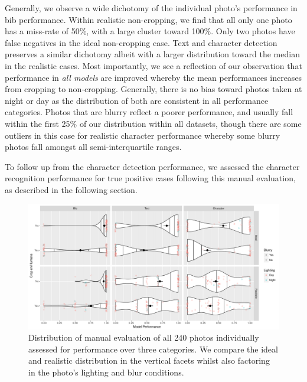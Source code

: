 Generally, we observe a wide dichotomy of the individual photo's performance in bib performance. Within realistic non-cropping, we find that all only one photo has a miss-rate of 50\%, with a large cluster toward 100\%. Only two photos have false negatives in the ideal non-cropping case. Text and character detection preserves a similar dichotomy albeit with a larger distribution toward the median in the realistic cases. Most importantly, we see a reflection of our observation that performance in \textit{all models} are improved whereby the mean performances increases from cropping to non-cropping. Generally, there is no bias toward photos taken at night or day as the distribution of both are consistent in all performance categories. Photos that are blurry reflect a poorer performance, and usually fall within the first 25\% of our distribution within all datasets, though there are some outliers in this case for realistic character performance whereby some blurry photos fall amongst all semi-interquartile ranges. 

To follow up from the character detection performance, we assessed the character recognition performance for true positive cases following this manual evaluation, as described in the following section.

\begin{landscape}

\begin{figure}
  \centering
  \includegraphics[width=1.20\paperwidth]{images/evaluation/mdets_all}
  \caption[Distribution of manual inspection evaluation]{Distribution of manual evaluation of all 240 photos individually assessed for performance over three categories. We compare the ideal and realistic distribution in the vertical facets whilst also factoring in the photo's lighting and blur conditions.}
  \label{fig:evaluation:results:mdets_all}
\end{figure}

\end{landscape}

